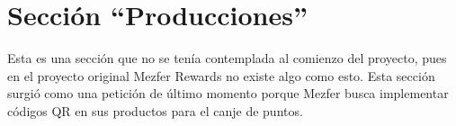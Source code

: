 \section{Sección ``Producciones''}
Esta es una sección que no se tenía contemplada al comienzo del proyecto, pues en el proyecto original Mezfer Rewards no existe algo como esto. Esta sección surgió como una petición de último momento porque Mezfer busca implementar códigos QR en sus productos para el canje de puntos. 
    
    
    